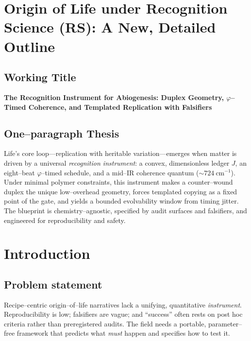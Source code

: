 \documentclass[11pt]{article}
\title{\papertitle}
\author{\normalsize Jonathan Washburn\\
\small Recognition Science, Recognition Physics Institute\\
\small Austin, Texas, USA \quad\texttt{jon@recognitionphysics.org}
}
\date{\small \today}
\begin{document}
\maketitle



\section*{Origin of Life under Recognition Science (RS): A New, Detailed Outline}

\subsection*{Working Title}
\textbf{The Recognition Instrument for Abiogenesis: Duplex Geometry, $\varphi$–Timed Coherence, and Templated Replication with Falsifiers}

\subsection*{One–paragraph Thesis}
Life’s core loop—replication with heritable variation—emerges when matter is driven by a universal \emph{recognition instrument}: a convex, dimensionless ledger $J$, an eight–beat $\varphi$–timed schedule, and a mid–IR coherence quantum ($\sim 724\ \mathrm{cm^{-1}}$). Under minimal polymer constraints, this instrument makes a counter–wound duplex the unique low–overhead geometry, forces templated copying as a fixed point of the gate, and yields a bounded evolvability window from timing jitter. The blueprint is chemistry–agnostic, specified by audit surfaces and falsifiers, and engineered for reproducibility and safety.

\section{Introduction}

\subsection{Problem statement}
Recipe–centric origin–of–life narratives lack a unifying, quantitative \emph{instrument}. Reproducibility is low; falsifiers are vague; and “success” often rests on post hoc criteria rather than preregistered audits. The field needs a portable, parameter–free framework that predicts what \emph{must} happen and specifies how to test it.
\end{document}
